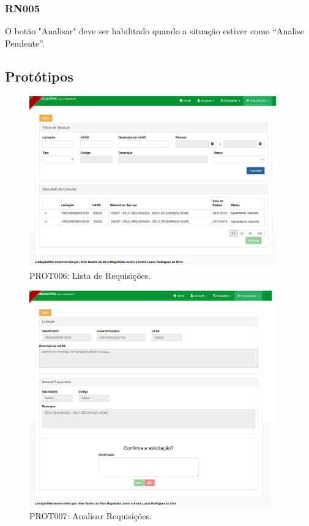 \begin{anexosenv}
\subsubsection*{RN005}\label{rn012}
O botão "Analisar" deve ser habilitado quando a situação estiver como “Analise Pendente”.

\subsection*{Protótipos}
\begin{figure}[htbp]
    \centering
    \includegraphics[width=0.95\textwidth]{figuras/prototipo006.png}
    \caption[PROT006: Lista de Requisições]{PROT006: Lista de Requisições.}
    \label{PROT006}
\end{figure}

\begin{figure}[htbp]
    \centering
    \includegraphics[width=0.95\textwidth]{figuras/prototipo007.png}
    \caption[PROT007: Analisar Requisições]{PROT007: Analisar Requisições.}
    \label{PROT007}
\end{figure}


\end{anexosenv}
